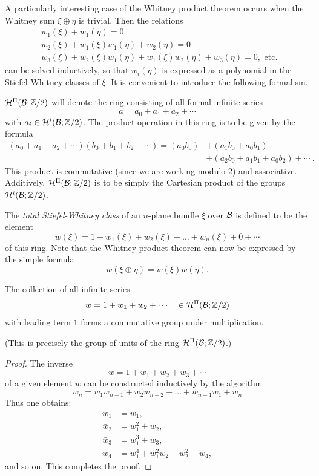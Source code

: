 A particularly interesting case of the Whitney product theorem occurs
when the Whitney sum $\xi\oplus\eta$ is trivial. Then the relations
\begin{align*}
		&w_{1}(\xi)+w_{1}(\eta)=0 \\
		&w_{2}(\xi)+w_{1}(\xi) w_{1}(\eta)+w_{2}(\eta)=0 \\
		&w_{3}(\xi)+w_{2}(\xi) w_{1}(\eta)+w_{1}(\xi) w_{2}(\eta)+w_{3}(\eta)=0, \text { etc. }
\end{align*}
can be solved inductively, so that $w_i(\eta)$ is expressed as a polynomial
in the Stiefel-Whitney classes of $\xi$. It is convenient to introduce the 
following formalism.
\begin{definition}\label{def:4-1}
	$\mathcal{H}^{\Pi}(\mathcal{\mathcal{B} };\mathbb{Z}/2)$ will denote the ring consisting of all 
	formal infinite series
	\[a=a_0+a_1+a_2+\cdots \]
	with $a_i\in\mathcal{H}^i(\mathcal{B} ;\mathbb{Z}/2)$. The product operation in this ring is to be given
	by the formula 
\begin{align*}
	\left(a_{0}+a_{1}+a_{2}+\cdots\right)\left(b_{0}+b_{1}+b_{2}+\cdots\right)=\left(a_{0} b_{0}\right)&+\left(a_{1} b_{0}+a_{0} b_{1}\right)\\&+\left(a_{2} b_{0}+a_{1} b_{1}+a_0b_2\right)+\cdots\ .
\end{align*}
	This product is 
	commutative (since we are working modulo $2$) and associative. Additively,  
	$\mathcal{H}^{\Pi}(\mathcal{B} ;\mathbb{Z}/2)$ is to be simply the Cartesian product of the groups $\mathcal{H}^i(\mathcal{B} ;\mathbb{Z}/2)$.
	
	The \textit{total Stiefel-Whitney class} of an $n$-plane bundle $\xi$ over $\mathcal{B} $ is
	defined to be the element
	\[w(\xi)=1+w_{1}(\xi)+w_{2}(\xi)+\dots+w_{n}(\xi)+0+\cdots\]
	of this ring. Note that the Whitney product theorem can now be expressed
	by the simple formula
	\[w(\xi \oplus \eta)=w(\xi) w(\eta).\]
\end{definition}

\begin{lemma}\label{lem-4-1}
	The collection of all infinite series
	\[w=1+w_1+w_2+\cdots\quad\in\mathcal{H}^{\Pi}(\mathcal{B} ;\mathbb{Z}/2)\]
	with leading term $1$ forms a commutative group under 
	multiplication.
\end{lemma}
(This is precisely the group of units of the  ring $\mathcal{H}^{\Pi}(\mathcal{B} ;\mathbb{Z}/2)$.)

\begin{proof}
	The inverse
	\[\bar{w}=1+\bar{w}_{1}+\bar{w}_{2}+\bar{w}_{3}+\cdots\]
	of a given element $w$ can be constructed inductively by the algorithm
		\[\bar{w}_{n}=w_{1} \bar{w}_{n-1}+w_{2} \bar{w}_{n-2}+\dots+w_{n-1}\bar{w}_{1}+w_{n}\]
	Thus one obtains:
	\begin{align*}
		\bar{w}_{1}&=w_{1}, \\
		\bar{w}_{2}&=w_{1}^{2}+w_{2}, \\
		\bar{w}_{3}&=w_{1}^{3}+w_{3},\\
		\bar{w}_{4}&=w_{1}^{4}+w_{1}^{2} w_{2}+w_{2}^{2}+w_{4},
	\end{align*}
	and so on. This completes the proof.
\end{proof}

